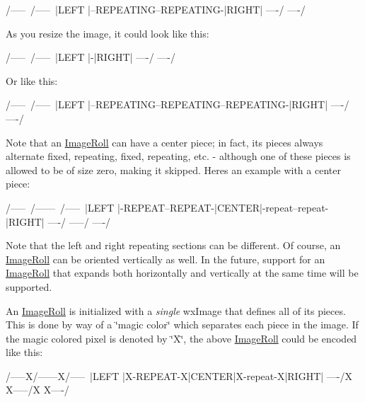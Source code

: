 \begin{DoxyVerb}  /-----\                       /-----\
  |LEFT |--REPEATING--REPEATING-|RIGHT|
  \-----/                       \-----/
\end{DoxyVerb}


As you resize the image, it could look like this\+:

\begin{DoxyVerb}  /-----\ /-----\
  |LEFT |-|RIGHT|
  \-----/ \-----/
\end{DoxyVerb}


Or like this\+:

\begin{DoxyVerb}  /-----\                                  /-----\
  |LEFT |--REPEATING--REPEATING--REPEATING-|RIGHT|
  \-----/                                  \-----/
\end{DoxyVerb}


Note that an \hyperlink{class_image_roll}{Image\+Roll} can have a center piece; in fact, its pieces always alternate fixed, repeating, fixed, repeating, etc. -\/ although one of these pieces is allowed to be of size zero, making it skipped. Here\textquotesingle{}s an example with a center piece\+:

\begin{DoxyVerb}  /-----\                /------\                /-----\
  |LEFT |-REPEAT--REPEAT-|CENTER|-repeat--repeat-|RIGHT|
  \-----/                \------/                \-----/
\end{DoxyVerb}


Note that the left and right repeating sections can be different. Of course, an \hyperlink{class_image_roll}{Image\+Roll} can be oriented vertically as well. In the future, support for an \hyperlink{class_image_roll}{Image\+Roll} that expands both horizontally and vertically at the same time will be supported.

An \hyperlink{class_image_roll}{Image\+Roll} is initialized with a {\itshape single} wx\+Image that defines all of its pieces. This is done by way of a \char`\"{}magic color\char`\"{} which separates each piece in the image. If the magic colored pixel is denoted by \char`\"{}\+X\char`\"{}, the above \hyperlink{class_image_roll}{Image\+Roll} could be encoded like this\+:

\begin{DoxyVerb}  /-----\X        X/------\X        X/-----\
  |LEFT |X-REPEAT-X|CENTER|X-repeat-X|RIGHT|
  \-----/X        X\------/X        X\-----/
\end{DoxyVerb}


